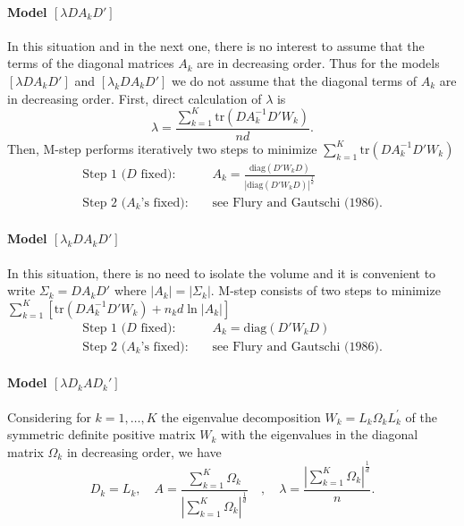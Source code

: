 \documentclass[12pt]{article}
\begin{document}
\paragraph{Model $[\lambda DA_{k}D']$}
In this situation and in the next one, there is no interest to assume that the terms of the
diagonal matrices $A_k$ are in decreasing order. Thus for the models $[\lambda DA_kD']$ and
$[\lambda_k DA_kD']$ we do not assume that the diagonal terms of $A_k$ are in decreasing order.
First, direct calculation of $\lambda$ is
\begin{equation}
  \lambda=\frac{\sum_{k=1}^{K} \mbox{tr}(DA_{k}^{-1}D'W_{k})}{nd}.
\end{equation}
Then, M-step performs iteratively two steps to minimize $\sum_{k=1}^{K}
\mbox{tr}(DA_{k}^{-1}D'W_{k})$
\begin{eqnarray}
  \mbox{Step 1 ($D$ fixed): } & & A_k=\frac{
    \mbox{diag}(D'W_kD)}{|\mbox{diag}(D'W_kD)|^{\frac{1}{d}}} \\
  \mbox{Step 2 ($A_k$'s fixed): } & & \mbox{see Flury and Gautschi
    (1986)}.
\end{eqnarray}

\paragraph{Model $[\lambda_{k} DA_{k}D']$}
In this situation, there is no need to isolate the volume and it is convenient to write
$\Sigma_{k}= DA_{k}D'$ where $|A_k|=|\Sigma_k|$. M-step consists of two steps to minimize
$\sum_{k=1}^{K} \left[\mbox{tr}(DA_{k}^{-1}D'W_{k}) +n_kd \ln |A_k| \right]$
\begin{eqnarray}
  \mbox{Step 1 ($D$ fixed): } & & A_k= \mbox{diag}(D'W_kD) \\
  \mbox{Step 2 ($A_k$'s fixed): } & & \mbox{see Flury and Gautschi
    (1986)}.
\end{eqnarray}


\paragraph{ Model $[\lambda D_{k}AD_{k}']$}
Considering for $k=1,\ldots,K$ the eigenvalue decomposition $W_k=L_k \Omega_k L^{'}_k$ of the
symmetric definite positive matrix $W_k$ with the eigenvalues in the diagonal matrix $\Omega_k$
in decreasing order, we have
\begin{equation}
  D_k = L_k, \quad A=\frac{\sum_{k=1}^{K} \Omega_k} {
    |\sum_{k=1}^{K}\Omega_k|^{\frac{1}{d}}} \quad, \quad \lambda
  =\frac{|\sum_{k=1}^{K} \Omega_k|^{\frac{1}{d}}} {n}.
\end{equation}
\end{document}

